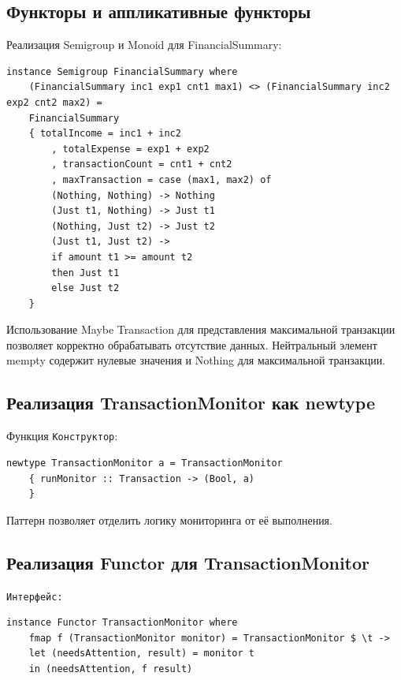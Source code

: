 \documentclass[a4paper, final]{article}
\begin{document}
	\subsection{Функторы и аппликативные функторы}
	
	Реализация Semigroup и Monoid для FinancialSummary:
	
	\begin{lstlisting}[caption={Определение типов данных для финансовых транзакций}, label={lst:types}]
	instance Semigroup FinancialSummary where
	(FinancialSummary inc1 exp1 cnt1 max1) <> (FinancialSummary inc2 exp2 cnt2 max2) =
	FinancialSummary
	{ totalIncome = inc1 + inc2
		, totalExpense = exp1 + exp2
		, transactionCount = cnt1 + cnt2
		, maxTransaction = case (max1, max2) of
		(Nothing, Nothing) -> Nothing
		(Just t1, Nothing) -> Just t1
		(Nothing, Just t2) -> Just t2
		(Just t1, Just t2) -> 
		if amount t1 >= amount t2 
		then Just t1 
		else Just t2
	}
	\end{lstlisting}
	
	Использование Maybe Transaction для представления максимальной транзакции позволяет корректно обрабатывать отсутствие данных. Нейтральный элемент mempty содержит нулевые значения и Nothing для максимальной транзакции.
	
	\subsection{Реализация TransactionMonitor как newtype}
	
	Функция \texttt{Конструктор}:
	
	\begin{lstlisting}[caption={Функция проверки порогового значения}, label={lst:threshold}]
	newtype TransactionMonitor a = TransactionMonitor 
	{ runMonitor :: Transaction -> (Bool, a) 
	}
	\end{lstlisting}
	
	Паттерн позволяет отделить логику мониторинга от её выполнения.
	
	\subsection{Реализация Functor для TransactionMonitor}
	
	\texttt{Интерфейс:} 
	
	\begin{lstlisting}[caption={Функция классификации транзакций}, label={lst:classify}]
	instance Functor TransactionMonitor where
	fmap f (TransactionMonitor monitor) = TransactionMonitor $ \t ->
	let (needsAttention, result) = monitor t
	in (needsAttention, f result)
	\end{lstlisting}
	
\end{document}
